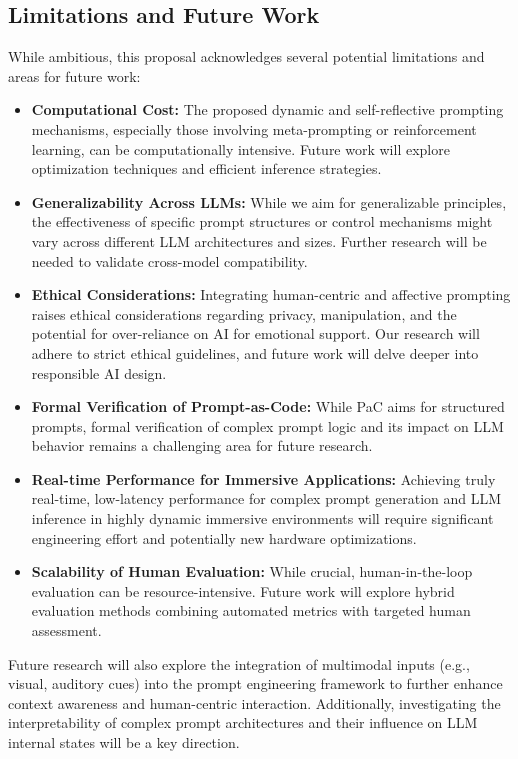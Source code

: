 \documentclass{article}
\begin{document}
\subsection{Limitations and Future Work}
While ambitious, this proposal acknowledges several potential limitations and areas for future work:
\begin{itemize}
    \item \textbf{Computational Cost:} The proposed dynamic and self-reflective prompting mechanisms, especially those involving meta-prompting or reinforcement learning, can be computationally intensive. Future work will explore optimization techniques and efficient inference strategies.
    \item \textbf{Generalizability Across LLMs:} While we aim for generalizable principles, the effectiveness of specific prompt structures or control mechanisms might vary across different LLM architectures and sizes. Further research will be needed to validate cross-model compatibility.
    \item \textbf{Ethical Considerations:} Integrating human-centric and affective prompting raises ethical considerations regarding privacy, manipulation, and the potential for over-reliance on AI for emotional support. Our research will adhere to strict ethical guidelines, and future work will delve deeper into responsible AI design.
    \item \textbf{Formal Verification of Prompt-as-Code:} While PaC aims for structured prompts, formal verification of complex prompt logic and its impact on LLM behavior remains a challenging area for future research.
    \item \textbf{Real-time Performance for Immersive Applications:} Achieving truly real-time, low-latency performance for complex prompt generation and LLM inference in highly dynamic immersive environments will require significant engineering effort and potentially new hardware optimizations.
\item \textbf{Scalability of Human Evaluation:} While crucial, human-in-the-loop evaluation can be resource-intensive. Future work will explore hybrid evaluation methods combining automated metrics with targeted human assessment.
\end{itemize}
Future research will also explore the integration of multimodal inputs (e.g., visual, auditory cues) into the prompt engineering framework to further enhance context awareness and human-centric interaction. Additionally, investigating the interpretability of complex prompt architectures and their influence on LLM internal states will be a key direction.
\end{document}
